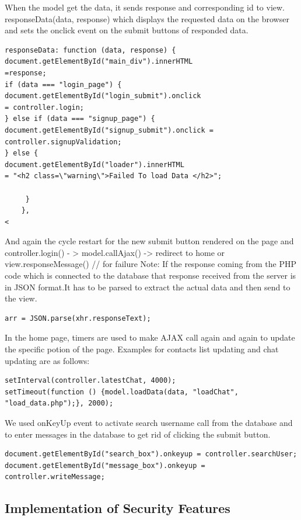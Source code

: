 \documentclass{article}
\begin{document}
When the model get the data, it sends response and corresponding id to view.
responseData(data, response) which displays the requested data on the browser and sets the onclick event on the submit buttons of responded data. \par
\begin{lstlisting}
responseData: function (data, response) {
document.getElementById("main_div").innerHTML 
=response; 
if (data === "login_page") {
document.getElementById("login_submit").onclick 
= controller.login;
} else if (data === "signup_page") {
document.getElementById("signup_submit").onclick = 
controller.signupValidation;
} else {
document.getElementById("loader").innerHTML 
= "<h2 class=\"warning\">Failed To load Data </h2>";

     }
	},
<\end{lstlisting}
And again the cycle restart for the new submit button rendered on the page and controller.login() - > model.callAjax() -> redirect to home or view.responseMessage() // for failure 
Note: If the response coming from the PHP code which is connected to the database that response received from the server is in JSON format.It has to be parsed to extract the actual data and then send to the view.\par
\begin{lstlisting}
arr = JSON.parse(xhr.responseText);
\end{lstlisting}
In the home page, timers are used to make AJAX call again and again to update the specific potion of the page.  
Examples for contacts list updating and chat updating are as follows: \par
\begin{lstlisting}
setInterval(controller.latestChat, 4000);
setTimeout(function () {model.loadData(data, "loadChat", 
"load_data.php");}, 2000);
\end{lstlisting}
We used onKeyUp event to activate search username call from the database and to enter messages in the database to get rid of clicking the submit button. \par
\begin{lstlisting}
document.getElementById("search_box").onkeyup = controller.searchUser;
document.getElementById("message_box").onkeyup = controller.writeMessage;
\end{lstlisting}


\subsection{Implementation of Security Features}
\end{document}
